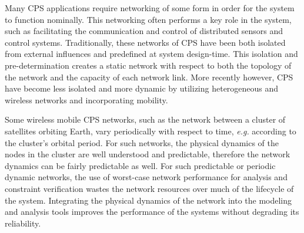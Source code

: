 Many CPS applications require networking of some form in order for the
system to function nominally.  This networking often performs a key
role in the system, such as facilitating the communication and control
of distributed sensors and control systems.  Traditionally, these
networks of CPS have been both isolated from external influences and
predefined at system design-time.  This isolation and
pre-determination creates a static network with respect to both the
topology of the network and the capacity of each network link.  More
recently however, CPS have become less isolated and more dynamic by
utilizing heterogeneous and wireless networks and incorporating
mobility.


Some wireless mobile CPS networks, such as the network between a
cluster of satellites orbiting Earth,
vary periodically with respect to time, \emph{e.g.} according to the
cluster's orbital period.  For such networks, the physical dynamics of
the nodes in the cluster are well understood and predictable,
therefore the network dynamics can be fairly predictable as well.  For
such predictable or periodic dynamic networks, the use of worst-case
network performance for analysis and constraint verification wastes
the network resources over much of the lifecycle of the
system. Integrating the physical dynamics of the network into the
modeling and analysis tools improves the performance of the systems
without degrading its reliability.



